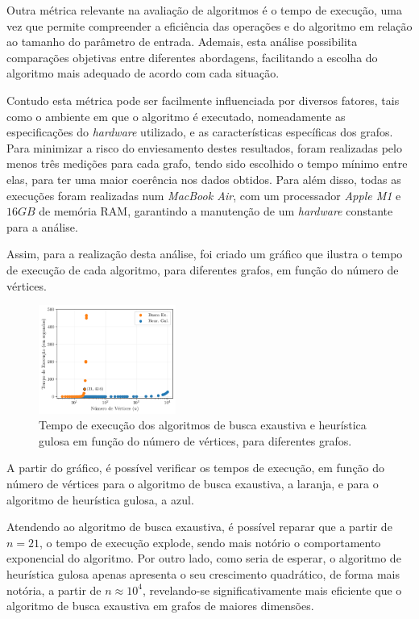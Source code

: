 \documentclass[mirror]{revdetua}
\begin{document}
Outra métrica relevante na avaliação de algoritmos é o tempo de execução, uma vez que permite compreender a eficiência das operações e do algoritmo em relação ao tamanho do parâmetro de entrada. Ademais, esta análise possibilita comparações objetivas entre diferentes abordagens, facilitando a escolha do algoritmo mais adequado de acordo com cada situação. 

Contudo esta métrica pode ser facilmente influenciada por diversos fatores, tais como o ambiente em que o algoritmo é executado, nomeadamente as especificações do \textit{hardware} utilizado, e as características específicas dos grafos. Para minimizar a risco do enviesamento destes resultados, foram realizadas pelo menos três medições para cada grafo, tendo sido escolhido o tempo mínimo entre elas, para ter uma maior coerência nos dados obtidos. Para além disso, todas as execuções foram realizadas num \textit{MacBook Air}, com um processador \textit{Apple M1} e $16GB$ de memória RAM, garantindo a manutenção de um \textit{hardware} constante para a análise.

Assim, para a realização desta análise, foi criado um gráfico que ilustra o tempo de execução de cada algoritmo, para diferentes grafos, em função do número de vértices.

\begin{figure}[h]
    \centering
    \includegraphics[width=0.4\textwidth]{../assets/execTIME.png}
    \caption{Tempo de execução dos algoritmos de busca exaustiva e heurística gulosa em função do número de vértices, para diferentes grafos.}
    \label{fig:exectime}
\end{figure}

A partir do gráfico, é possível verificar os tempos de execução, em função do número de vértices para o algoritmo de busca exaustiva, a laranja, e para o algoritmo de heurística gulosa, a azul. 

Atendendo ao algoritmo de busca exaustiva, é possível reparar que a partir de $n = 21$, o tempo de execução explode, sendo mais notório o comportamento exponencial do algoritmo. Por outro lado, como seria de esperar, o algoritmo de heurística gulosa apenas apresenta o seu crescimento quadrático, de forma mais notória, a partir de $n \approx 10^4$, revelando-se significativamente mais eficiente que o algoritmo de busca exaustiva em grafos de maiores dimensões.
\end{document}
